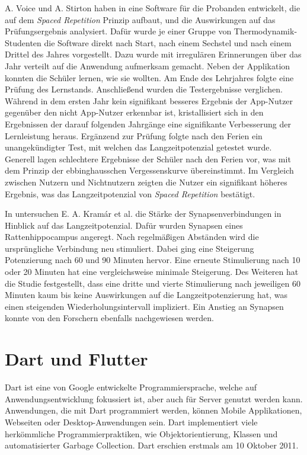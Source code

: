 A. Voice und A. Stirton haben in \cite{RD:SpacedRepetition} eine Software für die Probanden entwickelt, die auf dem \textit{Spaced Repetition} Prinzip aufbaut, und die Auswirkungen auf das Prüfungsergebnis analysiert. Dafür wurde je einer Gruppe von Thermodynamik-Studenten die Software direkt nach Start, nach einem Sechstel und nach einem Drittel des Jahres vorgestellt. Dazu wurde mit irregulären Erinnerungen über das Jahr verteilt auf die Anwendung aufmerksam gemacht. Neben der Applikation konnten die Schüler lernen, wie sie wollten. Am Ende des Lehrjahres folgte eine Prüfung des Lernstands. Anschließend wurden die Testergebnisse verglichen. Während in dem ersten Jahr kein signifikant besseres Ergebnis der App-Nutzer gegenüber den nicht App-Nutzer erkennbar ist, kristallisiert sich in den Ergebnissen der darauf folgenden Jahrgänge eine signifikante Verbesserung der Lernleistung heraus. Ergänzend zur Prüfung folgte nach den Ferien ein unangekündigter Test, mit welchen das Langzeitpotenzial getestet wurde. Generell lagen schlechtere Ergebnisse der Schüler nach den Ferien vor, was mit dem Prinzip der ebbinghausschen Vergessenskurve übereinstimmt. Im Vergleich zwischen Nutzern und Nichtnutzern zeigten die Nutzer ein signifikant höheres Ergebnis, was das Langzeitpotenzial von \textit{Spaced Repetition} bestätigt.

In \cite{PNAS:Synaptic} untersuchen E. A. Kramár et al. die Stärke der Synapsenverbindungen in Hinblick auf das Langzeitpotenzial. Dafür wurden Synapsen eines Rattenhippocampus angeregt. Nach regelmäßigen Abständen wird die ursprüngliche Verbindung neu stimuliert. Dabei ging eine Steigerung Potenzierung nach 60 und 90 Minuten hervor. Eine erneute Stimulierung nach 10 oder 20 Minuten hat eine vergleichsweise minimale Steigerung. Des Weiteren hat die Studie festgestellt, dass eine dritte und vierte Stimulierung nach jeweiligen 60 Minuten kaum bis keine Auswirkungen auf die Langzeitpotenzierung hat, was einen steigenden Wiederholungsintervall impliziert. Ein Anstieg an Synapsen konnte von den Forschern ebenfalls nachgewiesen werden.

\section{Dart und Flutter}
\label{dart_flutter}
Dart ist eine von Google entwickelte Programmiersprache, welche auf Anwendungsentwicklung fokussiert ist, aber auch für Server genutzt werden kann. Anwendungen, die mit Dart programmiert werden, können Mobile Applikationen, Webseiten oder Desktop-Anwendungen sein. Dart implementiert viele herkömmliche Programmierpraktiken, wie Objektorientierung, Klassen und automatisierter Garbage Collection. Dart erschien erstmals am 10 Oktober 2011.

